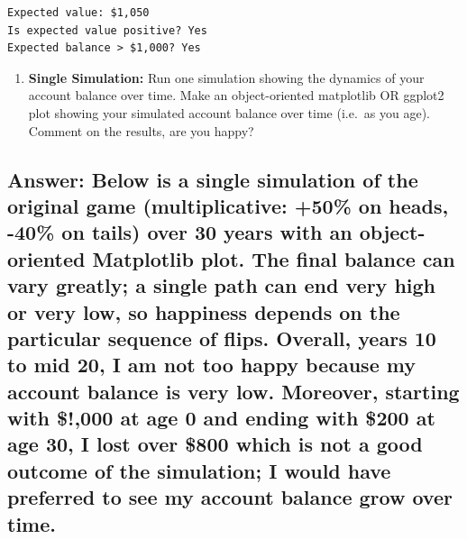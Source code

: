 \documentclass[
  letterpaper,
  DIV=11,
  numbers=noendperiod]{scrartcl}
\providecommand{\tightlist}{%
  \setlength{\itemsep}{0pt}\setlength{\parskip}{0pt}}
\theoremstyle{definition}
\theoremstyle{remark}
\begin{document}
\begin{verbatim}
Expected value: $1,050
Is expected value positive? Yes
Expected balance > $1,000? Yes
\end{verbatim}

\begin{enumerate}
\def\labelenumi{\arabic{enumi}.}
\setcounter{enumi}{2}
\tightlist
\item
  \textbf{Single Simulation:} Run one simulation showing the dynamics of
  your account balance over time. Make an object-oriented matplotlib OR
  ggplot2 plot showing your simulated account balance over time (i.e.~as
  you age). Comment on the results, are you happy?
\end{enumerate}

\subsection{Answer: Below is a single simulation of the original game
(multiplicative: +50\% on heads, -40\% on tails) over 30 years with an
object-oriented Matplotlib plot. The final balance can vary greatly; a
single path can end very high or very low, so happiness depends on the
particular sequence of flips. Overall, years 10 to mid 20, I am not too
happy because my account balance is very low. Moreover, starting with
\$!,000 at age 0 and ending with \$200 at age 30, I lost over \$800
which is not a good outcome of the simulation; I would have preferred to
see my account balance grow over
time.}\label{answer-below-is-a-single-simulation-of-the-original-game-multiplicative-50-on-heads--40-on-tails-over-30-years-with-an-object-oriented-matplotlib-plot.-the-final-balance-can-vary-greatly-a-single-path-can-end-very-high-or-very-low-so-happiness-depends-on-the-particular-sequence-of-flips.-overall-years-10-to-mid-20-i-am-not-too-happy-because-my-account-balance-is-very-low.-moreover-starting-with-000-at-age-0-and-ending-with-200-at-age-30-i-lost-over-800-which-is-not-a-good-outcome-of-the-simulation-i-would-have-preferred-to-see-my-account-balance-grow-over-time.}
\end{document}
